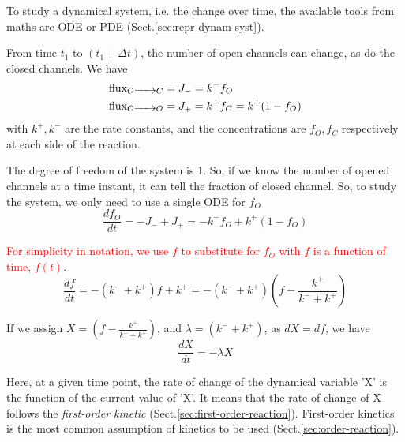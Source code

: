 To study a dynamical system, i.e. the change over time, the available tools from
maths are ODE or PDE (Sect.\ref{sec:repr-dynam-syst}).

From time $t_1$ to $(t_1+\Delta t)$, the number of open channels can change,
as do the closed channels. We have
\def\flux{{\text{flux}}}
\begin{equation}
  \begin{split}
    \label{eq:10}
    \flux_{O \ce{->} C} &= J_- = k^- f_O  \\
    \flux_{C \ce{->} O} &= J_+ = k^+ f_C = k^+ (1-f_O)
  \end{split}
\end{equation}
with $k^+, k^-$ are the rate constants, and
the concentrations are $f_O, f_C$ respectively at each side of the
reaction.

The degree of freedom of the system is 1. So, if we know the number of
opened channels at a time instant, it can tell the fraction of closed
channel. So, to study the system, we only need to use a single ODE for
$f_O$
\begin{equation}
  \label{eq:11}
  \frac{df_O}{dt} = - J_- + J_+  =  - k^- f_O + k^+ (1-f_O)
\end{equation}

\textcolor{red}{For simplicity in notation, we use $f$ to substitute
  for $f_O$ with $f$ is a function of time, $f(t)$}.
\begin{equation}
  \label{eq:254}
  \frac{df}{dt}  =  - (k^-+ k^+) f + k^+ =  - (k^-+ k^+) (f - \frac{k^+}{k^-+ k^+})
\end{equation}


If we assign $X = (f - \frac{k^+}{k^-+ k^+})$, and $\lambda = (k^-+ k^+)$, as
$dX = df$, we have
\begin{equation}
  \label{eq:255}
  \frac{dX}{dt} = - \lambda X
\end{equation}

Here, at a given time point, the rate of change of the dynamical variable 'X' is
the function of the current value of 'X'. It means that the rate of change of X
follows the {\it first-order kinetic} (Sect.\ref{sec:first-order-reaction}).
First-order kinetics is the most common assumption of kinetics to be used
(Sect.\ref{sec:order-reaction}).

